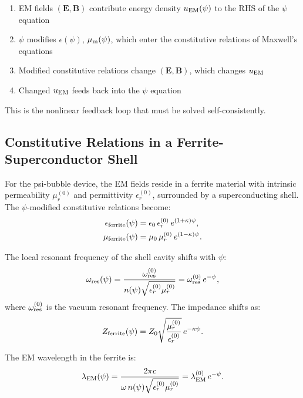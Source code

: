 \documentclass[aps,prd,twocolumn,superscriptaddress,floatfix,nofootinbib]{revtex4-2}
\newcommand{\kap}{\kappa}
\begin{document}
\begin{tcolorbox}[colback=blue!5!white, colframe=blue!60!black,
title=Feedback Loop Structure]
\begin{enumerate}[nosep]
\item EM fields $(\mathbf{E},\mathbf{B})$ contribute energy density
$u_{\rm EM}(\psi)$ to the RHS of the $\psi$ equation
\item $\psi$ modifies $\epsilon(\psi)$, $\mu_{\rm m}(\psi)$, which
enter the constitutive relations of Maxwell's equations
\item Modified constitutive relations change $(\mathbf{E},\mathbf{B})$,
which changes $u_{\rm EM}$
\item Changed $u_{\rm EM}$ feeds back into the $\psi$ equation
\end{enumerate}
This is the nonlinear feedback loop that must be solved self-consistently.
\end{tcolorbox}

\subsection{Constitutive Relations in a Ferrite-Superconductor Shell}
\label{sec:ferrite}

For the psi-bubble device, the EM fields reside in a ferrite material
with intrinsic permeability $\mu_r^{(0)}$ and permittivity
$\epsilon_r^{(0)}$, surrounded by a superconducting shell. The
$\psi$-modified constitutive relations become:
\begin{align}
\epsilon_{\rm ferrite}(\psi) &= \epsilon_0\,\epsilon_r^{(0)}\,
e^{(1+\kap)\psi}, \label{eq:eps-ferrite}\\
\mu_{\rm ferrite}(\psi) &= \mu_0\,\mu_r^{(0)}\,
e^{(1-\kap)\psi}. \label{eq:mu-ferrite}
\end{align}

The local resonant frequency of the shell cavity shifts with $\psi$:
\begin{equation}
\omega_{\rm res}(\psi) = \frac{\omega_{\rm res}^{(0)}}{n(\psi)
\sqrt{\epsilon_r^{(0)}\mu_r^{(0)}}}
= \omega_{\rm res}^{(0)}\,e^{-\psi},
\label{eq:freq-shift}
\end{equation}
where $\omega_{\rm res}^{(0)}$ is the vacuum resonant frequency. The
impedance shifts as:
\begin{equation}
Z_{\rm ferrite}(\psi) = Z_0\sqrt{\frac{\mu_r^{(0)}}{\epsilon_r^{(0)}}}
\,e^{-\kap\psi}.
\label{eq:Z-ferrite}
\end{equation}

The EM wavelength in the ferrite is:
\begin{equation}
\lambda_{\rm EM}(\psi) = \frac{2\pi c}{\omega\,n(\psi)
\sqrt{\epsilon_r^{(0)}\mu_r^{(0)}}}
= \lambda_{\rm EM}^{(0)}\,e^{-\psi}.
\label{eq:wavelength-shift}
\end{equation}
\end{document}
